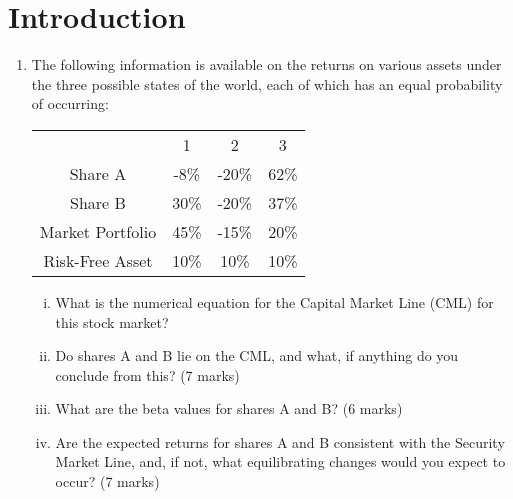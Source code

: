 \documentclass[a4paper,12pt]{article}
\begin{document}
\section{Introduction}
\begin{enumerate}
\item The following information is available on the returns on various assets under the three possible states of the world, each of which has an equal probability of occurring: 
\begin{center}
 \begin{tabular}{c|c|c|c}
  & 1 & 2 & 3 \\ 
Share A &  -8\% & -20\% &  62\%\\ 
Share B &   30\% & -20\% & 37\% \\
Market Portfolio & 45\% & -15\% & 20\%\\ 
Risk-Free Asset & 10\% & 10\% & 10\%\\ 
\end{tabular}   
\end{center}


\begin{enumerate}[(i)]
    \item What is the numerical equation for the Capital Market Line (CML) for this stock market?  
\item Do shares A and B lie on the CML, and what, if anything do you conclude from this? (7 marks) 
\item What are the beta values for shares A and B? (6 marks) 
\item Are the expected returns for shares A and B consistent with the Security Market Line, and, if not, what equilibrating changes would you expect to occur? (7 marks) 
\end{enumerate}


\end{enumerate}
\end{document}
